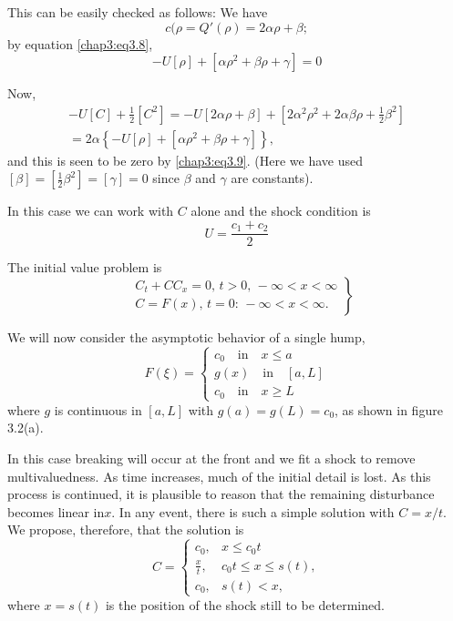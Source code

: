 This can be easily checked as follows: We have
$$
c(\rho=Q'(\rho)=2\alpha\rho +\beta;
$$
by equation \eqref{chap3:eq3.8},
\begin{equation}
-U[\rho]+\left[\alpha\rho^2 +\beta\rho +\gamma\right]=0 \tag{3.9}\label{chap3:eq3.9}
\end{equation}\pageoriginale

Now,
\begin{multline*}
-U[C]+\frac{1}{2}\left[C^2\right]=-U[2\alpha\rho +\beta]+\left[2\alpha^2\rho^2+2\alpha \beta\rho+\frac{1}{2}\beta^2\right]\\
=2\alpha\left\{-U[\rho]+\left[\alpha\rho^2+\beta\rho +\gamma\right]\right\},
\end{multline*}
and this is seen to be zero by \eqref{chap3:eq3.9}. (Here we have used $[\beta]= [\frac{1}{2}\beta^2]=[\gamma]=0$ since $\beta$ and $\gamma$ are constants).

In this case we can work with $C$ alone and the shock condition is 
$$
U=\frac{c_1+c_2}{2}
$$

The initial value problem is
\begin{equation}
\left.
\begin{aligned}
&C_t+CC_x=0,\, t>0,\, -\infty < x < \infty\\
&C=F(x),\,t=0:\, -\infty < x < \infty.
\end{aligned}
\right\}\tag{3.10}\label{chap3:eq3.10}
\end{equation}

We will now consider the asymptotic behavior of a single hump, \ie 
\begin{equation*}F(\xi)=
\begin{cases}
c_0\quad\text{in}\quad x\leq a\\
g(x)\quad\text{in}\quad [a,L]\\
c_0\quad\text{in}\quad x\geq L
\end{cases}
\end{equation*}
where $g$ is continuous in $ [a,L]$ with $g(a)=g(L)=c_0$, as shown in figure 3.2(a).

In this case breaking will occur at the front and we fit a shock to remove multivaluedness. As time increases, much of the initial detail is lost. As this process is continued, it is plausible to reason that the remaining disturbance becomes linear in\pageoriginale $x$. In any event, there is such a simple solution with $C=x/t$. We propose, therefore, that the solution is 
\begin{equation}
C=
\begin{cases}
c_0, & x\leq c_0t\\
\frac{x}{t}, &c_0t\leq x\leq s(t),\\
c_0,&s(t)<x,
\end{cases}\tag{3.11}\label{chap3:eq3.11}
\end{equation}
where $x=s(t)$ is the position of the shock still to be determined.

